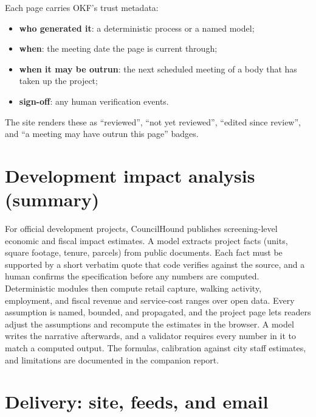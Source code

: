 \documentclass[11pt]{article}
\begin{document}
Each page carries OKF's trust metadata:
\begin{itemize}
  \item \textbf{who generated it}: a deterministic process or a named model;
  \item \textbf{when}: the meeting date the page is current through;
  \item \textbf{when it may be outrun}: the next scheduled meeting of a body that has
        taken up the project;
  \item \textbf{sign-off}: any human verification events.
\end{itemize}
The site renders these as ``reviewed'', ``not yet reviewed'', ``edited since review'', and
``a meeting may have outrun this page'' badges.

\section{Development impact analysis (summary)}

For official development projects, CouncilHound publishes screening-level economic and
fiscal impact estimates. A model extracts project facts (units, square footage, tenure,
parcels) from public documents. Each fact must be supported by a short verbatim quote that
code verifies against the source, and a human confirms the specification before any
numbers are computed. Deterministic modules then compute retail capture, walking
activity, employment, and fiscal revenue and service-cost ranges over open data. Every
assumption is named, bounded, and propagated, and the project page lets readers adjust
the assumptions and recompute the estimates in the browser. A model writes the narrative
afterwards, and a validator requires every number in it to match a computed output. The
formulas, calibration against city staff estimates, and limitations are documented in the
companion report.

\section{Delivery: site, feeds, and email}
\end{document}
